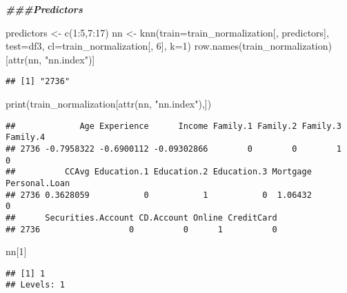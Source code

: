 \documentclass[
]{article}
\newenvironment{Shaded}{\begin{snugshade}}{\end{snugshade}}
\newcommand{\AttributeTok}[1]{\textcolor[rgb]{0.77,0.63,0.00}{#1}}
\newcommand{\DecValTok}[1]{\textcolor[rgb]{0.00,0.00,0.81}{#1}}
\newcommand{\DocumentationTok}[1]{\textcolor[rgb]{0.56,0.35,0.01}{\textbf{\textit{#1}}}}
\newcommand{\FunctionTok}[1]{\textcolor[rgb]{0.00,0.00,0.00}{#1}}
\newcommand{\NormalTok}[1]{#1}
\newcommand{\OtherTok}[1]{\textcolor[rgb]{0.56,0.35,0.01}{#1}}
\newcommand{\SpecialCharTok}[1]{\textcolor[rgb]{0.00,0.00,0.00}{#1}}
\newcommand{\StringTok}[1]{\textcolor[rgb]{0.31,0.60,0.02}{#1}}
\begin{document}
\begin{Shaded}
\begin{Highlighting}[]
\DocumentationTok{\#\#\#Predictors}

\NormalTok{predictors }\OtherTok{\textless{}{-}} \FunctionTok{c}\NormalTok{(}\DecValTok{1}\SpecialCharTok{:}\DecValTok{5}\NormalTok{,}\DecValTok{7}\SpecialCharTok{:}\DecValTok{17}\NormalTok{)}
\NormalTok{nn }\OtherTok{\textless{}{-}} \FunctionTok{knn}\NormalTok{(}\AttributeTok{train=}\NormalTok{train\_normalization[, predictors], }\AttributeTok{test=}\NormalTok{df3, }\AttributeTok{cl=}\NormalTok{train\_normalization[, }\DecValTok{6}\NormalTok{], }\AttributeTok{k=}\DecValTok{1}\NormalTok{)}
\FunctionTok{row.names}\NormalTok{(train\_normalization)[}\FunctionTok{attr}\NormalTok{(nn, }\StringTok{"nn.index"}\NormalTok{)] }
\end{Highlighting}
\end{Shaded}

\begin{verbatim}
## [1] "2736"
\end{verbatim}

\begin{Shaded}
\begin{Highlighting}[]
\FunctionTok{print}\NormalTok{(train\_normalization[}\FunctionTok{attr}\NormalTok{(nn, }\StringTok{"nn.index"}\NormalTok{),]) }
\end{Highlighting}
\end{Shaded}

\begin{verbatim}
##             Age Experience      Income Family.1 Family.2 Family.3 Family.4
## 2736 -0.7958322 -0.6900112 -0.09302866        0        0        1        0
##          CCAvg Education.1 Education.2 Education.3 Mortgage Personal.Loan
## 2736 0.3628059           0           1           0  1.06432             0
##      Securities.Account CD.Account Online CreditCard
## 2736                  0          0      1          0
\end{verbatim}

\begin{Shaded}
\begin{Highlighting}[]
\NormalTok{nn[}\DecValTok{1}\NormalTok{]}
\end{Highlighting}
\end{Shaded}

\begin{verbatim}
## [1] 1
## Levels: 1
\end{verbatim}
\end{document}
